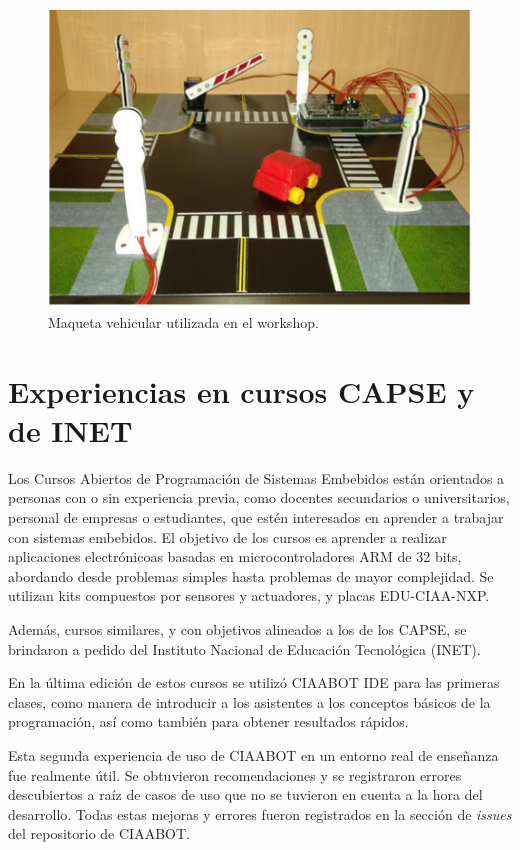 \begin{figure}[H]
\centering
\includegraphics[scale=.8]{./Figures/maqueta.png}
\caption{Maqueta vehicular utilizada en el workshop.}
\label{fig:maqueta}
\end{figure}

\section{Experiencias en cursos CAPSE y de INET}
Los Cursos Abiertos de Programación de Sistemas Embebidos están orientados a personas con o sin experiencia previa, como docentes secundarios o universitarios, personal de empresas o estudiantes, que estén interesados en aprender a trabajar con sistemas embebidos. El objetivo de los cursos es aprender a realizar aplicaciones electrónicoas basadas en microcontroladores ARM de 32 bits, abordando desde problemas simples hasta problemas de mayor complejidad. Se utilizan kits compuestos por sensores y actuadores, y placas EDU-CIAA-NXP.

Además, cursos similares, y con objetivos alineados a los de los CAPSE, se brindaron a pedido del Instituto Nacional de Educación Tecnológica (INET).

En la última edición de estos cursos se utilizó CIAABOT IDE para las primeras clases, como manera de introducir a los asistentes a los conceptos básicos de la programación, así como también para obtener resultados rápidos. 

Esta segunda experiencia de uso de CIAABOT en un entorno real de enseñanza fue realmente útil. Se obtuvieron recomendaciones y se registraron errores descubiertos a raíz de casos de uso que no se tuvieron en cuenta a la hora del desarrollo. Todas estas mejoras y errores fueron registrados en la sección de \emph{issues} del repositorio de CIAABOT.

